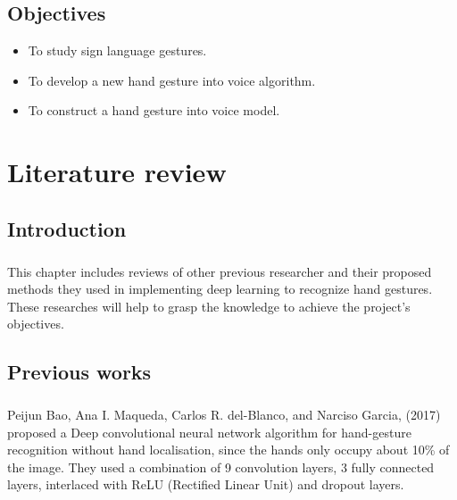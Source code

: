 \documentclass[12pt]{report}
\begin{document}
        \section{Objectives}
        \begin{itemize}
            \item To study sign language gestures.
            \item To develop a new hand gesture into voice algorithm.
            \item To construct a hand gesture into voice model.
        \end{itemize}    
    \chapter{Literature review}
        \section{Introduction}
            \paragraph{}
            This chapter includes reviews of other previous researcher
            and their proposed methods they used in implementing deep learning
            to recognize hand gestures. These researches will help to grasp the knowledge
            to achieve the project's objectives. 
        \section{Previous works}
            \paragraph{}
            Peijun Bao, Ana I. Maqueda, Carlos R. del-Blanco, and Narciso Garcia, 
            (2017) proposed a Deep convolutional neural network algorithm for hand-gesture recognition
            without hand localisation, since the hands only occupy about 10\% of the image.
            They used a combination of 9 convolution layers, 3 fully connected layers, interlaced with ReLU 
            (Rectified Linear Unit) and dropout layers.
            
\end{document}
